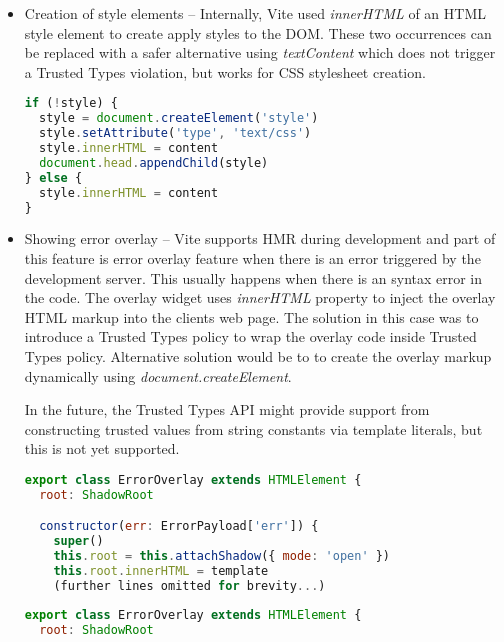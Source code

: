 \begin{itemize}
  \item Creation of style elements -- Internally, Vite used \textit{innerHTML} of an HTML style
        element to create apply styles to the DOM. These two occurrences can be replaced with a safer
        alternative using \textit{textContent} which does not trigger a Trusted Types violation, but works
        for CSS stylesheet creation.

        \bigskip
        \begin{lstlisting}[language=JavaScript, caption=Creation of style elements using innerHTML in Vite \cite{commit_vite_inner_html_styles}]
if (!style) {
  style = document.createElement('style')
  style.setAttribute('type', 'text/css')
  style.innerHTML = content
  document.head.appendChild(style)
} else {
  style.innerHTML = content
}
\end{lstlisting}

  \item Showing error overlay -- Vite supports HMR during development and part of this feature is
        error overlay feature when there is an error triggered by the development server. This
        usually happens when there is an syntax error in the code. The overlay widget uses
        \textit{innerHTML} property to inject the overlay HTML markup into the clients web page. The
        solution in this case was to introduce a Trusted Types policy to wrap the overlay code
        inside Trusted Types policy. Alternative solution would be to to create the overlay markup
        dynamically using \textit{document.createElement}.

        In the future, the Trusted Types API might provide support from constructing trusted values
        from string constants via template literals, but this is not yet supported.

        \bigskip
        \begin{lstlisting}[language=JavaScript, caption=Creation of error overlay using innerHTML property \cite{commit_vite_inner_html_overlay}]
export class ErrorOverlay extends HTMLElement {
  root: ShadowRoot

  constructor(err: ErrorPayload['err']) {
    super()
    this.root = this.attachShadow({ mode: 'open' })
    this.root.innerHTML = template
    (further lines omitted for brevity...)
\end{lstlisting}

        \bigskip
        \begin{lstlisting}[language=JavaScript, caption=Creation of error overlay using Trusted Types policy \cite{commit_vite_policy_overlay}]
export class ErrorOverlay extends HTMLElement {
  root: ShadowRoot


\end{lstlisting}
\end{itemize}
